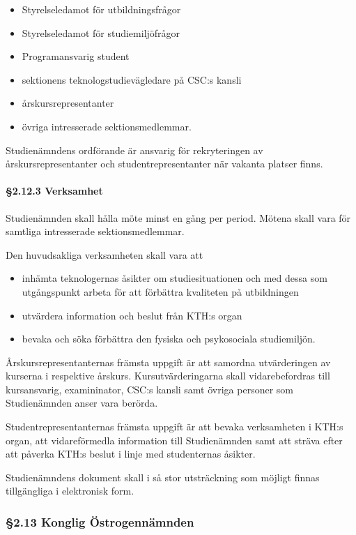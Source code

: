 \begin{itemize}
  \item Styrelseledamot för utbildningsfrågor
  \item Styrelseledamot för studiemiljöfrågor
  \item Programansvarig student
  \item sektionens teknologstudievägledare på CSC:s kansli
  \item årskursrepresentanter
  \item övriga intresserade sektionsmedlemmar.
\end{itemize}

Studienämndens ordförande är ansvarig för rekryteringen av årskursrepresentanter och studentrepresentanter när vakanta platser finns.

\paragraph{§2.12.3 Verksamhet}

Studienämnden skall hålla möte minst en gång per period. Mötena skall vara för samtliga intresserade sektionsmedlemmar.

Den huvudsakliga verksamheten skall vara att

\begin{itemize}
  \item inhämta teknologernas åsikter om studiesituationen och med dessa som utgångspunkt arbeta för att förbättra kvaliteten på utbildningen
  \item utvärdera information och beslut från KTH:s organ
  \item bevaka och söka förbättra den fysiska och psykosociala studiemiljön.
\end{itemize}

Årskursrepresentanternas främsta uppgift är att samordna utvärderingen av kurserna i respektive årskurs. Kursutvärderingarna skall vidarebefordras till kursansvarig, examininator, CSC:s kansli samt övriga personer som Studienämnden anser vara berörda.

Studentrepresentanternas främsta uppgift är att bevaka verksamheten i KTH:s organ, att vidareförmedla information till Studienämnden samt att sträva efter att påverka KTH:s beslut i linje med studenternas åsikter.

Studienämndens dokument skall i så stor utsträckning som möjligt finnas tillgängliga i elektronisk form.

\subsubsection{§2.13 Konglig Östrogennämnden}

